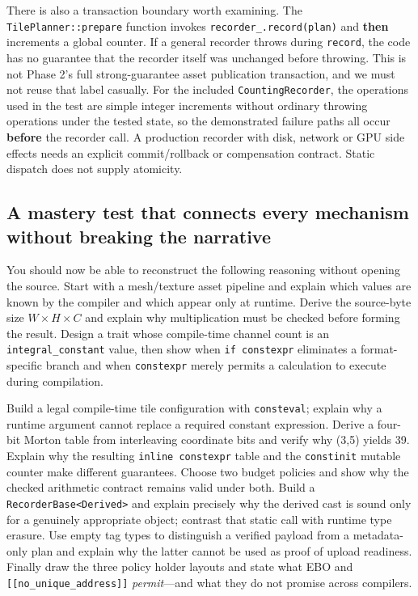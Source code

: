 There is also a transaction boundary worth examining. The \texttt{TilePlanner::prepare} function invokes \texttt{recorder\_.record(plan)} and \textbf{then} increments a global counter. If a general recorder throws during \texttt{record}, the code has no guarantee that the recorder itself was unchanged before throwing. This is not Phase 2's full strong-guarantee asset publication transaction, and we must not reuse that label casually. For the included \texttt{CountingRecorder}, the operations used in the test are simple integer increments without ordinary throwing operations under the tested state, so the demonstrated failure paths all occur \textbf{before} the recorder call. A production recorder with disk, network or GPU side effects needs an explicit commit/rollback or compensation contract. Static dispatch does not supply atomicity.

\subsection{A mastery test that connects every mechanism without breaking the narrative}\label{01-foundations-i-ch005-a-mastery-test-that-connects-every-mechanism-without-breaking-the-narrative}

You should now be able to reconstruct the following reasoning without opening the source. Start with a mesh/texture asset pipeline and explain which values are known by the compiler and which appear only at runtime. Derive the source-byte size \(W\times H\times C\) and explain why multiplication must be checked before forming the result. Design a trait whose compile-time channel count is an \texttt{integral\_constant} value, then show when \texttt{if\ constexpr} eliminates a format-specific branch and when \texttt{constexpr} merely permits a calculation to execute during compilation.

Build a legal compile-time tile configuration with \texttt{consteval}; explain why a runtime argument cannot replace a required constant expression. Derive a four-bit Morton table from interleaving coordinate bits and verify why (3,5) yields 39. Explain why the resulting \texttt{inline\ constexpr} table and the \texttt{constinit} mutable counter make different guarantees. Choose two budget policies and show why the checked arithmetic contract remains valid under both. Build a \texttt{RecorderBase\textless{}Derived\textgreater{}} and explain precisely why the derived cast is sound only for a genuinely appropriate object; contrast that static call with runtime type erasure. Use empty tag types to distinguish a verified payload from a metadata-only plan and explain why the latter cannot be used as proof of upload readiness. Finally draw the three policy holder layouts and state what EBO and \texttt{{[}{[}no\_unique\_address{]}{]}} \emph{permit}---and what they do not promise across compilers.

